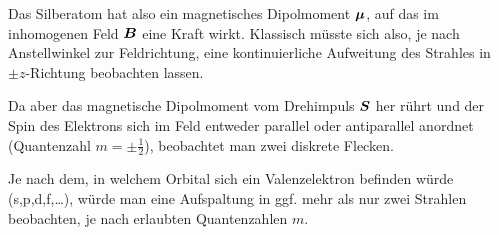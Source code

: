 Das Silberatom hat also ein magnetisches Dipolmoment $\boldsymbol{\mu}$, auf das im inhomogenen Feld $\boldsymbol{B}$ eine Kraft wirkt.
Klassisch müsste sich also, je nach Anstellwinkel zur Feldrichtung, eine kontinuierliche Aufweitung des Strahles in $\pm z$-Richtung beobachten lassen.

Da aber das magnetische Dipolmoment vom Drehimpuls $\boldsymbol{S}$ her rührt und der Spin des Elektrons sich im Feld entweder parallel oder antiparallel anordnet (Quantenzahl $m=\pm\frac{1}{2}$), beobachtet man zwei diskrete Flecken.

Je nach dem, in welchem Orbital sich ein Valenzelektron befinden würde (s,p,d,f,\dots), würde man eine Aufspaltung in ggf. mehr als nur zwei Strahlen beobachten, je nach erlaubten Quantenzahlen $m$.
